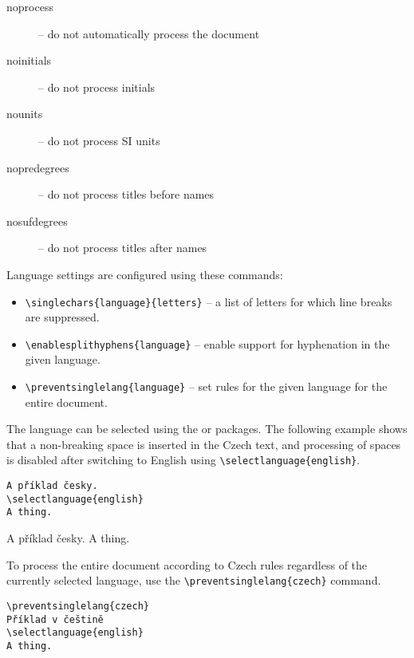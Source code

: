 \documentclass{ltugboat}
\begin{document}
{\begin{description}
  \item [noprocess] – do not automatically process the document
  \item [noinitials] – do not process initials
  \item [nounits] – do not process SI units
  \item [nopredegrees] – do not process titles before names
  \item [nosufdegrees] – do not process titles after names
\end{description}

Language settings are configured using these commands:

\begin{itemize}
  \item\verb|\singlechars{language}{letters}| – a list of letters for which
    line breaks are suppressed.
  \item\verb|\enablesplithyphens{language}| – enable support for hyphenation in
    the given language.
  \item\verb|\preventsinglelang{language}| – set rules for the given language
    for the entire document.
\end{itemize}

The language can be selected using the  or 
packages. The following example shows that a non-breaking space is inserted in
the Czech text, and processing of spaces is disabled after switching to English
using \verb|\selectlanguage{english}|.

\begin{verbatim}
A příklad česky.
\selectlanguage{english}
A thing.
\end{verbatim}

\preventsingledebugon

\noindent 
A příklad česky.
A thing.

\preventsingledebugoff



\bigskip

To process the entire document according to Czech rules regardless of the
currently selected language, use the \verb|\preventsinglelang{czech}| command.

\begin{verbatim}
\preventsinglelang{czech}
Příklad v češtině
\selectlanguage{english}
A thing.
\end{verbatim}

}
\end{document}
